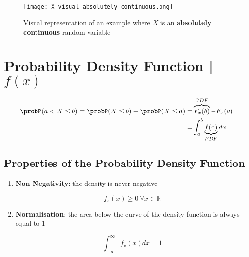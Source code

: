             \begin{figure}[h]
                \centering
                \texttt{[image: X\_visual\_absolutely\_continuous.png]}
                \caption{Visual representation of an example where \(X\) is an \textbf{absolutely continuous} random variable}
                \label{fig:X_visual_absolutely_continuous}
            \end{figure}

\newpage
\section{Probability Density Function | \(f(x)\)}

        \begin{equation}
        \begin{split}
            \probP (a < X \leq b) = \probP (X \leq b) - \probP (X \leq a) = & \overbrace{F_x (b)}^{CDF} - F_x (a) \\
            = & \int_{a}^{b} \underbrace{f(x)}_{PDF} dx
        \end{split}     
        \end{equation}
            

\newpage
        \subsection{Properties of the Probability Density Function}

            \begin{enumerate}
                \item \textbf{Non Negativity}: the density is never negative

                    \begin{equation}
                        f_x (x) \geq 0 \ \forall x \in \mathbb{R}
                    \end{equation}
                    
                \item \textbf{Normalisation}: the area below the curve of the density function is always equal to 1

                    \begin{equation}
                        \int_{-\infty}^{\infty} f_x (x) dx = 1
                    \end{equation}
                    
            \end{enumerate}

